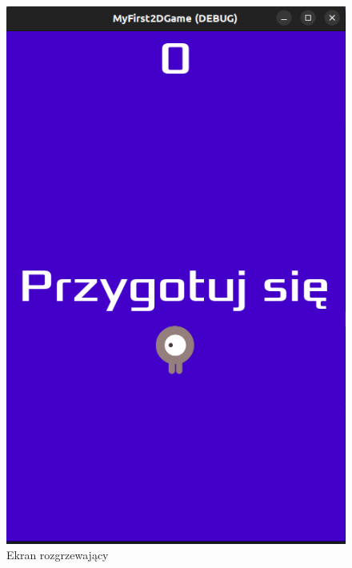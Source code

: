 \documentclass[a4paper]{article}
\begin{document}
\begin{center}
\begin{figure}
		\includegraphics[height=0.35\textheight]{get_ready.png}
		\caption{Ekran rozgrzewający}
	\end{figure}
	\begin{figure}
		\centering

\end{figure}
\end{center}
\end{document}
